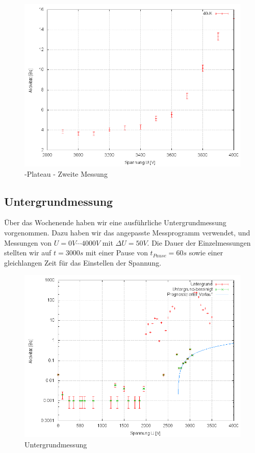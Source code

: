 \begin{figure}[H]
 \centering \includegraphics[width = 0.99\linewidth]{Messwerte/plots/K40_plateau2.png}
 \caption{-Plateau - Zweite Messung}
\end{figure}

\subsection{Untergrundmessung}
Über das Wochenende haben wir eine ausführliche Untergrundmessung vorgenommen. Dazu haben wir das angepasste Messprogramm verwendet, und Messungen von $U = 0V \cdots 4000V$ mit $\Delta U = 50V$. Die Dauer der Einzelmessungen stellten wir auf $t=3000s$ mit einer Pause von $t_{Pause} = 60 s$ sowie einer gleichlangen Zeit für das Einstellen der Spannung.

\begin{figure}[H]
 \centering \includegraphics[width = 0.99\linewidth]{Messwerte/plots/untergrund_we_bereinigt.png}
 \caption{Untergrundmessung}
\end{figure}


